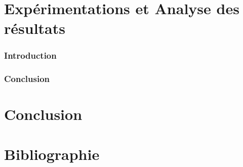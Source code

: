 \documentclass[12pt,a4paper]{article}
\begin{document}
	\newpage
	
	\part{Expérimentations et Analyse des résultats}
		\section*{Introduction}
		\section*{Conclusion}
		
	\newpage
		
	\part*{Conclusion}
	
	\part*{Bibliographie}
\end{document}
